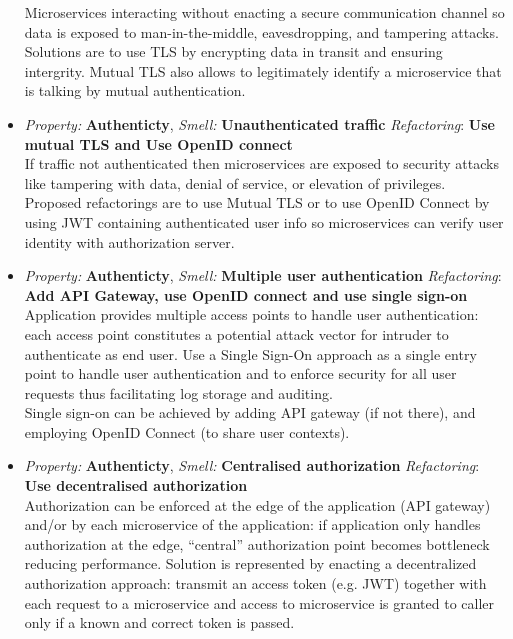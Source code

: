 \documentclass[10pt,a4paper]{report}
\begin{document}
\begin{itemize}
	 Microservices interacting without enacting a secure communication channel so data is exposed to man-in-the-middle, eavesdropping, and tampering attacks. Solutions are to use TLS by encrypting data in transit and ensuring intergrity. Mutual TLS also allows to legitimately identify a microservice that is talking by mutual authentication. 
	 
	 \item \textit{Property: } \textbf{Authenticty}, \textit{Smell:} \textbf{Unauthenticated traffic} \textit{Refactoring}: \textbf{Use mutual TLS and Use OpenID connect} \\
	 
	 If traffic not authenticated then microservices are exposed to security attacks like tampering with data,
	 denial of service, or elevation of privileges. Proposed refactorings are to use Mutual TLS or to use OpenID Connect by using JWT containing authenticated user info so microservices can verify user identity with authorization server. 
	 
	 
	 \item \textit{Property: } \textbf{Authenticty}, \textit{Smell:} \textbf{Multiple user authentication} \textit{Refactoring}: \textbf{Add API Gateway, use OpenID connect and use single sign-on} \\
	 
	 Application provides multiple access points to handle user authentication: each access point constitutes a potential attack vector for intruder to authenticate as end user. Use a Single Sign-On approach
	 as a single entry point to handle user authentication and to enforce security for all user requests thus facilitating log storage and auditing.\\Single sign-on can be achieved by adding API gateway (if not there), and employing OpenID Connect (to share user contexts).
	 
	  \item \textit{Property: } \textbf{Authenticty}, \textit{Smell:} \textbf{Centralised authorization} \textit{Refactoring}: \textbf{Use decentralised authorization} \\
	  
	  Authorization can be enforced at the edge of the application (API gateway) and/or by each microservice
	  of the application: if application only handles authorization at the edge, “central” authorization point becomes bottleneck reducing performance.
	  Solution is represented by enacting a decentralized authorization approach: transmit an access token (e.g. JWT) together with each request to a microservice and access to microservice is granted to caller only if a known and correct token is passed.
	 
	 
\end{itemize}
\end{document}
